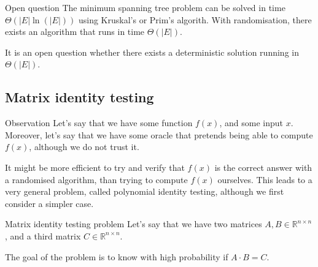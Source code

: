 \documentclass[a4paper]{article}
\begin{document}
\begin{parag}{Open question}
    The minimum spanning tree problem can be solved in time $\Theta\left(\left|E\right| \ln\left(\left|E\right|\right)\right)$ using Kruskal's or Prim's algorith. With randomisation, there exists an algorithm that runs in time $\Theta\left(\left|E\right|\right)$. 

    It is an open question whether there exists a deterministic solution running in $\Theta\left(\left|E\right|\right)$.
\end{parag}

\subsection{Matrix identity testing}

\begin{parag}{Observation}
    Let's say that we have some function $f\left(x\right)$, and some input $x$. Moreover, let's say that we have some oracle that pretends being able to compute $f\left(x\right)$, although we do not trust it. 

    It might be more efficient to try and verify that $f\left(x\right)$ is the correct answer with a randomised algorithm, than trying to compute $f\left(x\right)$ ourselves. This leads to a very general problem, called polynomial identity testing, although we first consider a simpler case.
\end{parag}

\begin{parag}{Matrix identity testing problem}
    Let's say that we have two matrices $A, B \in \mathbb{R}^{n \times n}$, and a third matrix $C \in \mathbb{R}^{n \times n}$.

    The goal of the  problem is to know with high probability if $A\cdot B = C$.
\end{parag}
\end{document}
